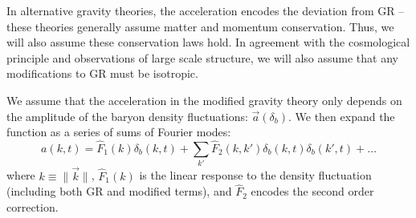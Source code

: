 \documentclass[12pt,floats,floatfix,showpacs,amssymb,amsmath,prl,superscriptaddress,nofootinbib, aps]{revtex4-2}
\begin{document}
In alternative gravity theories, the acceleration encodes the deviation from GR -- these theories generally assume matter and momentum conservation. Thus, we will also assume these conservation laws hold. In agreement with the cosmological principle and observations of large scale structure, we will also assume that any modifications to GR must be isotropic. 


We assume that the acceleration in the modified gravity theory only depends on the amplitude of the baryon density fluctuations: $\vec a(\delta_b)$. We then expand the function as a series of sums of Fourier modes:
\begin{equation}
    a(k,t) = \hat{F}_1(k) \delta_b(k,t) + \sum_{k'} \hat{F}_2(k, k') \delta_b(k,t) \delta_b(k',t) + \ldots
\end{equation}
where $k \equiv \lVert\vec{k}\rVert$, $\hat{F}_1(k)$ is the linear response to the density fluctuation (including both GR and modified terms), and $\hat{F}_2$ encodes the second order correction.

\end{document}
